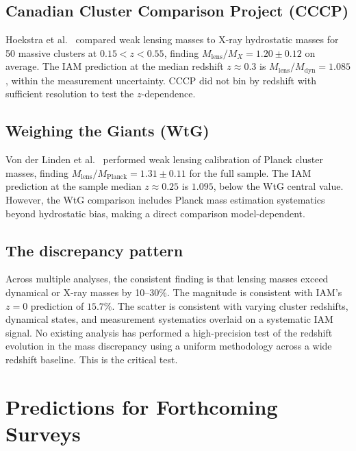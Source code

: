 \documentclass[12pt,a4paper]{article}
\begin{document}
\subsection{Canadian Cluster Comparison Project (CCCP)}

Hoekstra et al.~\citep{Hoekstra2015} compared weak lensing masses to X-ray
hydrostatic masses for 50 massive clusters at $0.15 < z < 0.55$, finding
$M_\mathrm{lens}/M_X = 1.20 \pm 0.12$ on average. The IAM prediction at the
median redshift $z \approx 0.3$ is $M_\mathrm{lens}/M_\mathrm{dyn} = 1.085$,
within the measurement uncertainty. CCCP did not bin by redshift with sufficient
resolution to test the $z$-dependence.

\subsection{Weighing the Giants (WtG)}

Von der Linden et al.~\citep{vonDerLinden2014} performed weak lensing calibration
of Planck cluster masses, finding $M_\mathrm{lens}/M_\mathrm{Planck} = 1.31
\pm 0.11$ for the full sample. The IAM prediction at the sample median
$z \approx 0.25$ is $1.095$, below the WtG central value. However, the WtG
comparison includes Planck mass estimation systematics beyond hydrostatic bias,
making a direct comparison model-dependent.

\subsection{The discrepancy pattern}

Across multiple analyses, the consistent finding is that lensing masses exceed
dynamical or X-ray masses by 10--30\%. The magnitude is consistent with IAM's
$z = 0$ prediction of $15.7\%$. The scatter is consistent with varying cluster
redshifts, dynamical states, and measurement systematics overlaid on a systematic
IAM signal. No existing analysis has performed a high-precision test of the
redshift evolution in the mass discrepancy using a uniform methodology across a
wide redshift baseline. This is the critical test.

\section{Predictions for Forthcoming Surveys}
\end{document}
